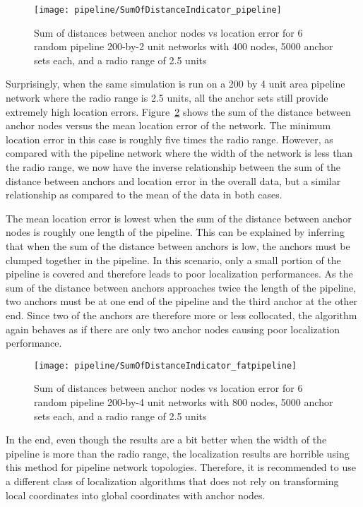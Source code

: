 \begin{figure}
  \centering
	\texttt{[image: pipeline/SumOfDistanceIndicator\_pipeline]}
	\caption[Sum of distances between anchor nodes vs location error in a pipeline topology]{Sum of distances between anchor nodes vs location error for 6 random pipeline 200-by-2 unit networks with 400 nodes, 5000 anchor sets each, and a radio range of 2.5 units}
	\label{fig:pipelineindicator}
\end{figure}

Surprisingly, when the same simulation is run on a 200 by 4 unit area pipeline network where the radio range is 2.5 units, all the anchor sets still provide extremely high location errors.  Figure~\ref{fig:fatpipelineindicator} shows the sum of the distance between anchor nodes versus the mean location error of the network.  The minimum location error in this case is roughly five times the radio range.  However, as compared with the pipeline network where the width of the network is less than the radio range, we now have the inverse relationship between the sum of the distance between anchors and location error in the overall data, but a similar relationship as compared to the mean of the data in both cases.  

The mean location error is lowest when the sum of the distance between anchor nodes is roughly one length of the pipeline.  This can be explained by inferring that when the sum of the distance between anchors is low, the anchors must be clumped together in the pipeline.  In this scenario, only a small portion of the pipeline is covered and therefore leads to poor localization performances. As the sum of the distance between anchors approaches twice the length of the pipeline, two anchors must be at one end of the pipeline and the third anchor at the other end.  Since two of the anchors are therefore more or less collocated, the algorithm again behaves as if there are only two anchor nodes causing poor localization performance.

\begin{figure}
  \centering
	\texttt{[image: pipeline/SumOfDistanceIndicator\_fatpipeline]}
	\caption[Sum of distances between anchor nodes vs location error in a pipeline topology]{Sum of distances between anchor nodes vs location error for 6 random pipeline 200-by-4 unit networks with 800 nodes, 5000 anchor sets each, and a radio range of 2.5 units}
	\label{fig:fatpipelineindicator}
\end{figure}

In the end, even though the results are a bit better when the width of the pipeline is more than the radio range, the localization results are horrible using this method for pipeline network topologies.  Therefore, it is recommended to use a different class of localization algorithms that does not rely on transforming local coordinates into global coordinates with anchor nodes.
